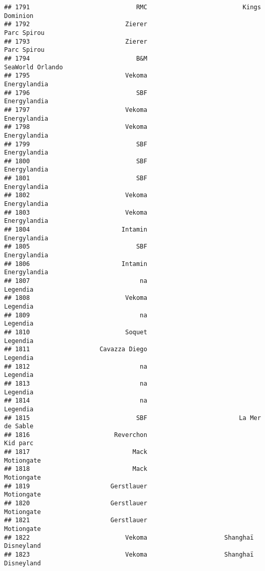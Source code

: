 \documentclass[
]{article}
\begin{document}
\begin{verbatim}
## 1791                             RMC                          Kings Dominion
## 1792                          Zierer                             Parc Spirou
## 1793                          Zierer                             Parc Spirou
## 1794                             B&M                        SeaWorld Orlando
## 1795                          Vekoma                            Energylandia
## 1796                             SBF                            Energylandia
## 1797                          Vekoma                            Energylandia
## 1798                          Vekoma                            Energylandia
## 1799                             SBF                            Energylandia
## 1800                             SBF                            Energylandia
## 1801                             SBF                            Energylandia
## 1802                          Vekoma                            Energylandia
## 1803                          Vekoma                            Energylandia
## 1804                         Intamin                            Energylandia
## 1805                             SBF                            Energylandia
## 1806                         Intamin                            Energylandia
## 1807                              na                                Legendia
## 1808                          Vekoma                                Legendia
## 1809                              na                                Legendia
## 1810                          Soquet                                Legendia
## 1811                   Cavazza Diego                                Legendia
## 1812                              na                                Legendia
## 1813                              na                                Legendia
## 1814                              na                                Legendia
## 1815                             SBF                         La Mer de Sable
## 1816                       Reverchon                                Kid parc
## 1817                            Mack                              Motiongate
## 1818                            Mack                              Motiongate
## 1819                      Gerstlauer                              Motiongate
## 1820                      Gerstlauer                              Motiongate
## 1821                      Gerstlauer                              Motiongate
## 1822                          Vekoma                     Shanghaï Disneyland
## 1823                          Vekoma                     Shanghaï Disneyland

\end{verbatim}
\end{document}
